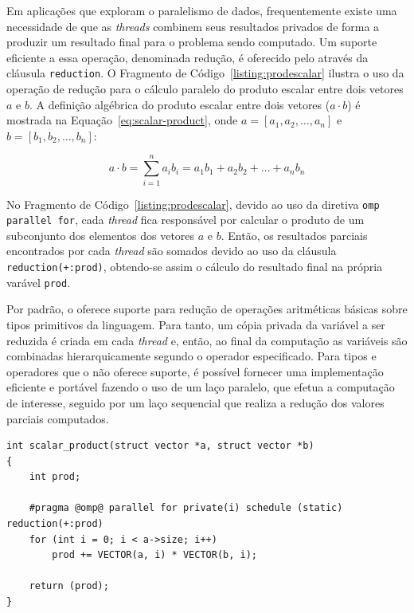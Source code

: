 \documentclass{SBCbookchapter}
\begin{document}
		Em aplicações que exploram o paralelismo de dados,
		frequentemente existe uma necessidade de que as \textit{threads}
		combinem seus resultados privados de forma a produzir um
		resultado final para o problema sendo computado. Um suporte
		eficiente a essa operação, denominada redução, é oferecido pelo
		\openmp através da cláusula \texttt{reduction}. O Fragmento de
		Código~\ref{listing:prodescalar} ilustra o uso da operação de
		redução para o cálculo paralelo do produto escalar entre dois
		vetores $a$ e $b$. A definição algébrica do produto escalar entre dois
		vetores ($a \cdot b$) é mostrada na Equação~\ref{eq:scalar-product},
		onde $a=[a_1, a_2, \dots, a_n]$ e $b=[b_1, b_2, \dots, b_n]$:
		
			\begin{equation}
			a \cdot b = \sum_{i=1}^{n} a_i b_i = a_1 b_1 + a_2 b_2 + \dots + a_n b_n
			\label{eq:scalar-product}
			\end{equation}		
		
		No Fragmento de Código~\ref{listing:prodescalar}, devido ao uso
		da diretiva \texttt{omp parallel for}, cada \textit{thread} fica responsável por
		calcular o produto de um subconjunto dos elementos dos vetores $a$ e $b$.
		Então, os resultados parciais encontrados por cada \textit{thread} são
		somados devido ao uso da cláusula \texttt{reduction(+:prod)}, obtendo-se
		assim o cálculo do resultado final na própria varável \texttt{prod}.

		Por padrão, o \openmp oferece suporte  para redução de operações
		aritméticas básicas sobre tipos primitivos da linguagem. Para
		tanto, um cópia privada da variável a ser reduzida é criada em
		cada \textit{thread} e, então, ao final da computação as
		variáveis são combinadas hierarquicamente segundo o operador
		especificado. Para tipos e operadores que o \openmp não oferece
		suporte, é possível fornecer uma implementação eficiente e
		portável fazendo o uso de um laço paralelo, que efetua a
		computação de interesse, seguido por um laço sequencial que
		realiza a redução dos valores parciais computados.

\begin{lstlisting}[float,floatplacement=b,frame=single, caption=Produto escalar.,
label=listing:prodescalar]
int scalar_product(struct vector *a, struct vector *b)
{
	int prod;

	#pragma @omp@ parallel for private(i) schedule (static) reduction(+:prod)
	for (int i = 0; i < a->size; i++)
		prod += VECTOR(a, i) * VECTOR(b, i);
	
	return (prod);
}
\end{lstlisting}
\end{document}
